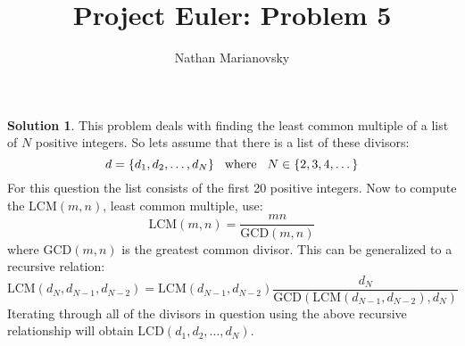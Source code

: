 \documentclass[12pt, letterpaper, onecolumn, conference, final]{IEEEtran}
\title{Project Euler: Problem 5}
\author{Nathan Marianovsky}
\theoremstyle{definition}
\newtheorem*{problem*}{Problem}
\newtheorem*{solution*}{Solution}
\theoremstyle{plain}
\begin{document}
\maketitle

\begin{center}
\end{center}

\vspace{.3cm}
\begin{solution*}
This problem deals with finding the least common multiple of a list of $N$ positive integers. So lets assume that there is a list of these divisors:
\begin{equation*}
d = \{d_1,d_2,\dots,d_N\} \hspace{.3cm} \text{where} \hspace{.3cm} N \in \{2,3,4,\dots\}
\end{equation*}
For this question the list consists of the first 20 positive integers. Now to compute the LCM$(m,n)$, least common multiple, use:
\begin{equation*}
\text{LCM}(m,n) = \frac{mn}{\text{GCD}(m,n)}
\end{equation*}
where GCD$(m,n)$ is the greatest common divisor. This can be generalized to a recursive relation:
\begin{equation*}
\text{LCM}(d_N,d_{N-1},d_{N-2}) = \text{LCM}(d_{N-1},d_{N-2}) \frac{d_N}{\text{GCD}(\text{LCM}(d_{N-1},d_{N-2}),d_N)}
\end{equation*}
Iterating through all of the divisors in question using the above recursive relationship will obtain LCD$(d_1,d_2,\dots,d_N)$.
\end{solution*}
\end{document}
